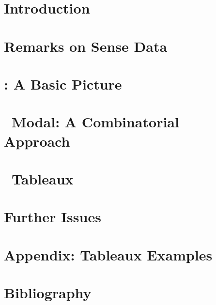 \documentclass[12pt,leqno,openany]{book}
\begin{document}
\doublespace

\frontmatter

\mainmatter
\chapter*{Introduction}


\chapter{Remarks on Sense Data}

\chapter{\GO: A Basic Picture}

\chapter{\GO\ Modal: A Combinatorial Approach}

\chapter{\GOModal\ Tableaux}

\chapter{Further Issues}

\chapter*{Appendix: Tableaux Examples}
\begin{singlespace}

\end{singlespace}

\chapter*{Bibliography}

\end{document}
